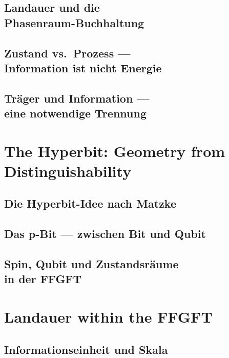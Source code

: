 \documentclass[11pt,oneside]{book}
\theoremstyle{plain}
\begin{document}
\chapter[Landauer und die Phasenraum-Buchhaltung]{Landauer und die\\ Phasenraum-Buchhaltung}

\chapter[Zustand vs.\ Prozess]{Zustand vs.\ Prozess ---\\ Information ist nicht Energie}

\chapter[Träger und Information]{Träger und Information ---\\ eine notwendige Trennung}


\part{The Hyperbit: Geometry from Distinguishability}
\chapter{Die Hyperbit-Idee nach Matzke}

\chapter{Das p-Bit --- zwischen Bit und Qubit}

\chapter[Spin, Qubit und Zustandsräume]{Spin, Qubit und Zustandsräume\\ in der FFGFT}


\part{Landauer within the FFGFT}
\chapter{Informationseinheit und Skala}
\label{ch:informationseinheit_skala}

\end{document}
